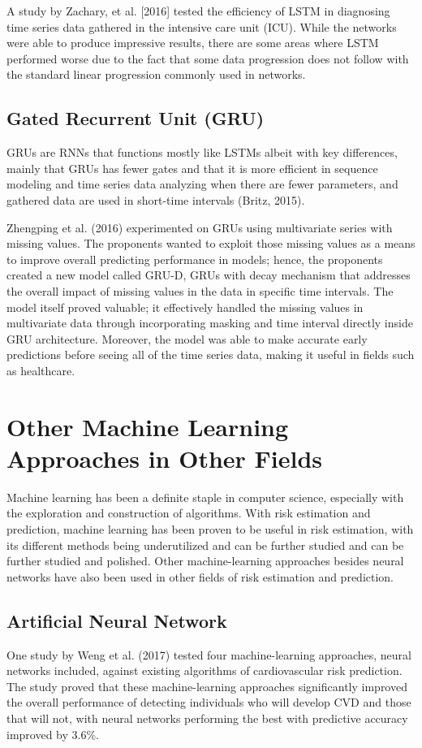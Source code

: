\documentclass[10pt,11pt,12pt,oneside]{book}
\begin{document}
        A study by Zachary, et al. [2016] tested the efficiency of LSTM in diagnosing time series data gathered in the intensive care unit (ICU). While the networks were able to produce impressive results, there are some areas where LSTM performed worse due to the fact that some data progression does not follow with the standard linear progression commonly used in networks. \cite{DBLP:journals/corr/LiptonKEW15}
        \subsection{Gated Recurrent Unit (GRU)}
        GRUs are RNNs that functions mostly like LSTMs albeit with key differences, mainly that GRUs has fewer gates and that it is more efficient in sequence modeling and time series data analyzing when there are fewer parameters, and gathered data are used in short-time intervals (Britz, 2015). \cite{britz_2016}

        Zhengping et al. (2016) experimented on GRUs using multivariate series with missing values. The proponents wanted to exploit those missing values as a means to improve overall predicting performance in models; hence, the proponents created a new model called GRU-D, GRUs with decay mechanism that addresses the overall impact of missing values in the data in specific time intervals. The model itself proved valuable; it effectively handled the missing values in multivariate data through incorporating masking and time interval directly inside GRU architecture. Moreover, the model was able to make accurate early predictions before seeing all of the time series data, making it useful in fields such as healthcare. \cite{DBLP:journals/corr/ChePCSL16}
    \section{Other Machine Learning Approaches in Other Fields}
    Machine learning has been a definite staple in computer science, especially with the exploration and construction of algorithms. With risk estimation and prediction, machine learning has been proven to be useful in risk estimation, with its different methods being underutilized and can be further studied and can be further studied and polished. \cite{Kruppa2012} Other machine-learning approaches besides neural networks have also been used in other fields of risk estimation and prediction.
        \subsection{Artificial Neural Network}
        One study by Weng et al. (2017) tested four machine-learning approaches, neural networks included, against existing algorithms of cardiovascular risk prediction. The study proved that these machine-learning approaches significantly improved the overall performance of detecting individuals who will develop CVD and those that will not, with neural networks performing the best with predictive accuracy improved by 3.6\%. \cite{Weng2017}
\end{document}
